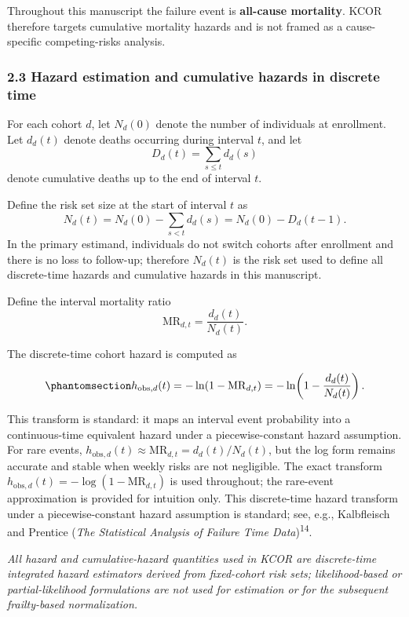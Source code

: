 \documentclass[
]{article}
\begin{document}
Throughout this manuscript the failure event is \textbf{all-cause
mortality}. KCOR therefore targets cumulative mortality hazards and is
not framed as a cause-specific competing-risks analysis.

\subsubsection{2.3 Hazard estimation and cumulative hazards in discrete
time}\label{hazard-estimation-and-cumulative-hazards-in-discrete-time}

For each cohort \(d\), let \(N_d(0)\) denote the number of individuals
at enrollment. Let \(d_d(t)\) denote deaths occurring during interval
\(t\), and let \[
D_d(t) = \sum_{s \le t} d_d(s)
\] denote cumulative deaths up to the end of interval \(t\).

Define the risk set size at the start of interval \(t\) as \[
N_d(t) = N_d(0) - \sum_{s < t} d_d(s) = N_d(0) - D_d(t-1).
\] In the primary estimand, individuals do not switch cohorts after
enrollment and there is no loss to follow-up; therefore \(N_d(t)\) is
the risk set used to define all discrete-time hazards and cumulative
hazards in this manuscript.

Define the interval mortality ratio \[
\mathrm{MR}_{d,t} = \frac{d_d(t)}{N_d(t)}.
\]

The discrete-time cohort hazard is computed as

\begin{equation}\protect\phantomsection\label{eq:hazard-discrete}{
h_{\mathrm{obs},d}(t) = -\ln\!\left(1 - \mathrm{MR}_{d,t}\right) = -\ln\!\left(1 - \frac{d_d(t)}{N_d(t)}\right).
}\end{equation}

This transform is standard: it maps an interval event probability into a
continuous-time equivalent hazard under a piecewise-constant hazard
assumption. For rare events,
\(h_{\mathrm{obs},d}(t) \approx \mathrm{MR}_{d,t} = d_d(t)/N_d(t)\), but
the log form remains accurate and stable when weekly risks are not
negligible. The exact transform
\(h_{\mathrm{obs},d}(t) = -\log(1 - \mathrm{MR}_{d,t})\) is used
throughout; the rare-event approximation is provided for intuition only.
This discrete-time hazard transform under a piecewise-constant hazard
assumption is standard; see, e.g., Kalbfleisch and Prentice (\emph{The
Statistical Analysis of Failure Time Data})\textsuperscript{14}.

\emph{All hazard and cumulative-hazard quantities used in KCOR are
discrete-time integrated hazard estimators derived from fixed-cohort
risk sets; likelihood-based or partial-likelihood formulations are not
used for estimation or for the subsequent frailty-based normalization.}
\end{document}
